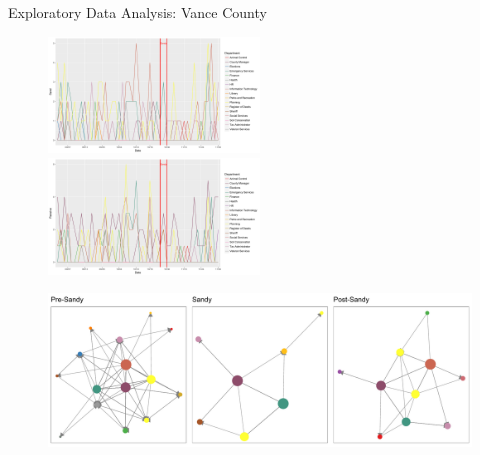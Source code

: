 \documentclass[10pt]{beamer}
\theoremstyle{definition}
\theoremstyle{remark}
\begin{document}
\begin{frame}{Exploratory Data Analysis: Vance County}
	\begin{minipage}{0.85\linewidth}
	 	 \begin{figure}
	 	 	\includegraphics[width=0.5\textwidth, trim = 0cm 0cm 5cm 0cm, clip=true]{figures/VanceSend.pdf}	 	
	 	 	\includegraphics[width=0.5\textwidth, trim = 0cm 0cm 5cm 0cm, clip=true]{figures/VanceReceive.pdf}
	 	 \end{figure}	\vspace{-.5cm}
	 \begin{figure}
	 		 	\includegraphics[width=1\textwidth]{figures/VanceNetwork.pdf}
	 		 		 \end{figure}	
\end{minipage} 
\begin{minipage}{0.13\linewidth}
		 \begin{figure}

\end{figure}
\end{minipage}
\end{frame}
\end{document}
